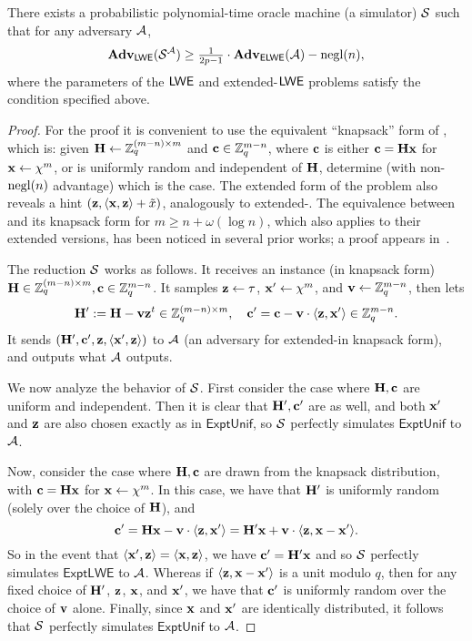 \begin{theorem}
  \label{thm:ext-lwe-hard}
  There exists a probabilistic polynomial-time oracle machine (a
  simulator) $\mathcal{S}$ such that for any adversary $\mathcal{A}$,
  \[\mathbf{Adv}_{\mathsf{LWE}}(\mathcal{S}^{\mathcal{A}}) \geq
  \tfrac{1}{2p-1} \cdot \mathbf{Adv}_{\mathsf{ELWE}}(\mathcal{A}) - \operatorname{negl}(n), \]
  where the parameters of the $\mathsf{LWE}$ and extended-$\mathsf{LWE}$ problems
  satisfy the condition specified above.
\end{theorem}



\begin{proof}
  For the proof it is convenient to use the equivalent ``knapsack''
  form of \lwe, which is: given $\mathbf{H} \gets \mathbb{Z}_q^{(m-n) \times m}$ and
  $\mathbf{c} \in \mathbb{Z}_q^{m-n}$, where $\mathbf{c}$ is either $\mathbf{c}=\mathbf{H} \mathbf{x}$
  for $\mathbf{x} \gets \chi^{m}$, or is uniformly random and independent
  of $\mathbf{H}$, determine (with non-$\operatorname{negl}(n)$ advantage) which is the
  case.  The extended form of the problem also reveals a hint $(\mathbf{z},
  \langle{\ensuremath{\mathbf{x}},\ensuremath{\mathbf{z}}}\rangle+\tilde{x})$, analogously to extended-\lwe.  The
  equivalence between \lwe and its knapsack form for $m \geq
  n+\omega(\log n)$, which also applies to their extended versions,
  has been noticed in several prior works; a proof appears
  in~\cite[Lemmas 4.8 and 4.9]{DBLP:conf/crypto/MicciancioM11}.

  The reduction $\mathcal{S}$ works as follows.  It receives an \lwe instance
  (in knapsack form) $\mathbf{H} \in \mathbb{Z}_q^{(m-n) \times m}, \mathbf{c} \in
  \mathbb{Z}_q^{m-n}$.  It samples $\mathbf{z} \gets \tau$, $\mathbf{x}' \gets \chi^{m}$,
  and $\mathbf{v} \gets \mathbb{Z}_q^{m-n}$, then lets
  \[\mathbf{H}' := \mathbf{H} - \mathbf{v} \mathbf{z}^{t} \in \mathbb{Z}_q^{(m-n) \times m}, \quad
  \mathbf{c}' = \mathbf{c} - \mathbf{v} \cdot \langle{\ensuremath{\mathbf{z}}, \ensuremath{\mathbf{x}}'}\rangle \in \mathbb{Z}_q^{m-n}. \]
  It sends $(\mathbf{H}', \mathbf{c}', \mathbf{z}, \langle{\ensuremath{\mathbf{x}}', \ensuremath{\mathbf{z}}}\rangle)$ to $\mathcal{A}$
  (an adversary for extended-\lwe in knapsack form), and outputs what
  $\mathcal{A}$ outputs.

  We now analyze the behavior of $\mathcal{S}$.  First consider the case
  where $\mathbf{H}, \mathbf{c}$ are uniform and independent.  Then it is clear
  that $\mathbf{H}', \mathbf{c}'$ are as well, and both $\mathbf{x}'$ and $\mathbf{z}$ are
  also chosen exactly as in $\textsf{ExptUnif}$, so $\mathcal{S}$ perfectly
  simulates $\textsf{ExptUnif}$ to $\mathcal{A}$.

  Now, consider the case where $\mathbf{H}, \mathbf{c}$ are drawn from the
  knapsack distribution, with $\mathbf{c}=\mathbf{H} \mathbf{x}$ for $\mathbf{x} \gets
  \chi^{m}$.  In this case, we have that $\mathbf{H}'$ is uniformly random
  (solely over the choice of $\mathbf{H}$), and \[ \mathbf{c}' = \mathbf{H} \mathbf{x} -
  \mathbf{v} \cdot \langle{\ensuremath{\mathbf{z}}, \ensuremath{\mathbf{x}}'}\rangle = \mathbf{H}' \mathbf{x} + \mathbf{v} \cdot
  \langle{\ensuremath{\mathbf{z}}, \ensuremath{\mathbf{x}}-\ensuremath{\mathbf{x}}'}\rangle. \] So in the event that $\langle{\ensuremath{\mathbf{x}}',
    \ensuremath{\mathbf{z}}}\rangle=\langle{\ensuremath{\mathbf{x}}, \ensuremath{\mathbf{z}}}\rangle$, we have $\mathbf{c}'=\mathbf{H}' \mathbf{x}$ and so
  $\mathcal{S}$ perfectly simulates $\textsf{ExptLWE}$ to $\mathcal{A}$.  Whereas if
  $\langle{\ensuremath{\mathbf{z}}, \ensuremath{\mathbf{x}}-\ensuremath{\mathbf{x}}'}\rangle$ is a unit modulo $q$, then for any
  fixed choice of $\mathbf{H}'$, $\mathbf{z}$, $\mathbf{x}$, and $\mathbf{x}'$, we have
  that $\mathbf{c}'$ is uniformly random over the choice of $\mathbf{v}$ alone.
  Finally, since $\mathbf{x}$ and $\mathbf{x}'$ are identically distributed, it
  follows that $\mathcal{S}$ perfectly simulates $\textsf{ExptUnif}$ to
  $\mathcal{A}$.


\end{proof}
